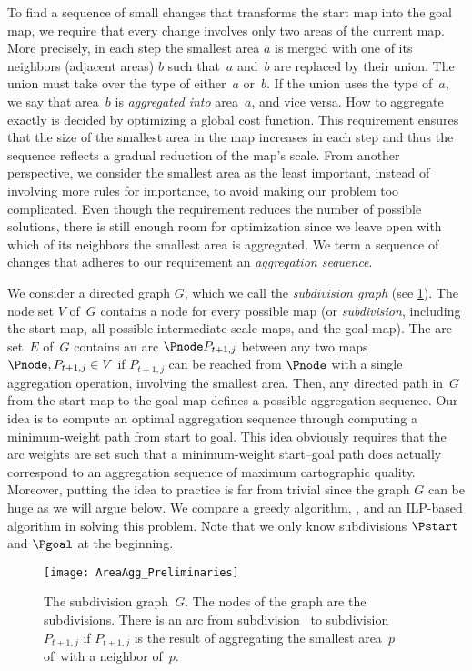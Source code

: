To find a sequence of small changes that transforms the start 
map into the goal map,
we require that every change involves only two areas of the 
current map.
More precisely, in each step the smallest area $a$ is merged 
with one of its neighbors (adjacent areas) $b$
such that~$a$ and~$b$ are replaced by their union.
The union must take over the type of either~$a$ or~$b$. 
If the union uses the type of~$a$, 
we say that area~$b$ is \emph{aggregated into} area~$a$, 
and vice versa. 
How to aggregate exactly is decided by 
optimizing a global cost function.
This requirement ensures that the 
size of the smallest area in the map increases in each step
and thus the sequence reflects a gradual reduction of the 
map's scale.
From another perspective, 
we consider the smallest area as the least important, 
instead of involving more rules for importance, 
to avoid making our problem too complicated. 
Even though the requirement reduces the number of possible 
solutions,
there is still enough room for optimization 
since we leave open with
which of its neighbors the smallest area is aggregated.
We term a sequence of changes that adheres to our requirement an
\emph{aggregation sequence}.



We consider a directed graph $G$, 
which we call the \emph{subdivision graph} 
(see \fig\ref{fig:AreaAgg_SubdivisionName}). 
The node set $V$ of~$G$ contains a node for every
possible map (or \emph{subdivision}, including the start map, all
possible intermediate-scale maps, and the goal map).
The arc set~$E$ of~$G$ contains an arc $\Pnode P_{t+1,j}$ 
between any two maps $\Pnode, P_{t+1,j} \in V$ 
if $P_{t+1,j}$ can be reached from $\Pnode$ 
with a single aggregation operation,
involving the smallest area.
Then, any directed path in~$G$ from the start map to the goal map
defines a possible aggregation sequence.
Our idea is to compute an optimal aggregation sequence through 
computing a minimum-weight path from start to goal.
This idea obviously requires that the arc weights are 
set such that a minimum-weight start--goal
path does actually correspond to an aggregation sequence of 
maximum cartographic quality.  
Moreover, putting the idea to practice is far from trivial 
since the graph $G$ can be huge as we will argue below.
We compare a greedy algorithm, \Astar, and an ILP-based algorithm
in solving this problem.
Note that we only know subdivisions 
$\Pstart$ and $\Pgoal$ at the beginning. 


\begin{figure}[tb]
	\centering
	\texttt{[image: AreaAgg\_Preliminaries]}
	\caption{The subdivision graph~$G$. 
		The nodes of the graph are the subdivisions. 
		There is an arc	from subdivision~\Pnode 
		to subdivision~${P}_{t+1,j}$ 
		if ${P}_{t+1,j}$ is the result of 
		aggregating the smallest area~$p$ of~\Pnode with a 
		neighbor of~$p$.}
	\label{fig:AreaAgg_SubdivisionName}
\end{figure}

